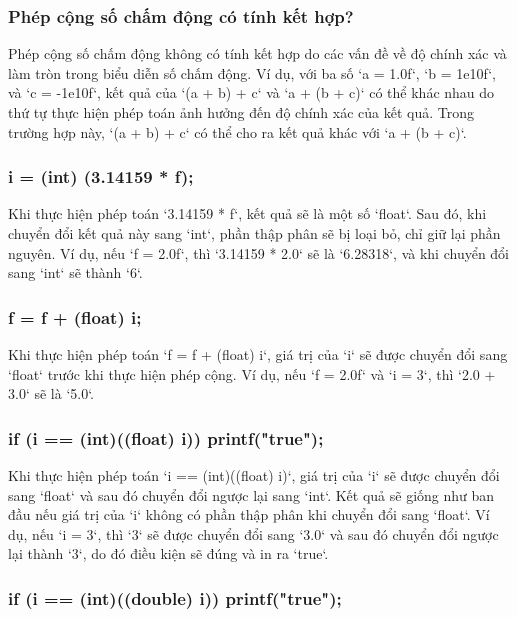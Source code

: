 \subsubsection{Phép cộng số chấm động có tính kết hợp?}

Phép cộng số chấm động không có tính kết hợp do các vấn đề về độ chính xác và làm tròn trong biểu diễn số chấm động. Ví dụ, với ba số `a = 1.0f`, `b = 1e10f`, và `c = -1e10f`, kết quả của `(a + b) + c` và `a + (b + c)` có thể khác nhau do thứ tự thực hiện phép toán ảnh hưởng đến độ chính xác của kết quả. Trong trường hợp này, `(a + b) + c` có thể cho ra kết quả khác với `a + (b + c)`.

\subsubsection{i = (int) (3.14159 * f);}

Khi thực hiện phép toán `3.14159 * f`, kết quả sẽ là một số `float`. Sau đó, khi chuyển đổi kết quả này sang `int`, phần thập phân sẽ bị loại bỏ, chỉ giữ lại phần nguyên. Ví dụ, nếu `f = 2.0f`, thì `3.14159 * 2.0` sẽ là `6.28318`, và khi chuyển đổi sang `int` sẽ thành `6`.

\subsubsection{f = f + (float) i;}

Khi thực hiện phép toán `f = f + (float) i`, giá trị của `i` sẽ được chuyển đổi sang `float` trước khi thực hiện phép cộng. Ví dụ, nếu `f = 2.0f` và `i = 3`, thì `2.0 + 3.0` sẽ là `5.0`.

\subsubsection{if (i == (int)((float) i)) printf("true");}

Khi thực hiện phép toán `i == (int)((float) i)`, giá trị của `i` sẽ được chuyển đổi sang `float` và sau đó chuyển đổi ngược lại sang `int`. Kết quả sẽ giống như ban đầu nếu giá trị của `i` không có phần thập phân khi chuyển đổi sang `float`. Ví dụ, nếu `i = 3`, thì `3` sẽ được chuyển đổi sang `3.0` và sau đó chuyển đổi ngược lại thành `3`, do đó điều kiện sẽ đúng và in ra `true`.

\subsubsection{if (i == (int)((double) i)) printf("true");}

